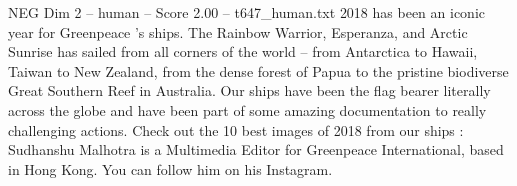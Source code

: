 \begin{textsample}{NEG Dim 2 – human – Score 2.00 – t647\_human.txt}  \label{ex:f2_neg_039}
2018 has been an iconic year for Greenpeace ’s ships.
The Rainbow Warrior, Esperanza, and Arctic Sunrise has sailed from all corners of the world – from Antarctica to Hawaii, Taiwan to New Zealand, from the dense forest of Papua to the pristine biodiverse Great Southern Reef in Australia.
Our ships have been the flag bearer literally across the globe and have been part of some amazing documentation to really challenging actions.
Check out the 10 best images of 2018 from our ships : Sudhanshu Malhotra is a Multimedia Editor for Greenpeace International, based in Hong Kong.
You can follow him on his Instagram.

\end{textsample}
